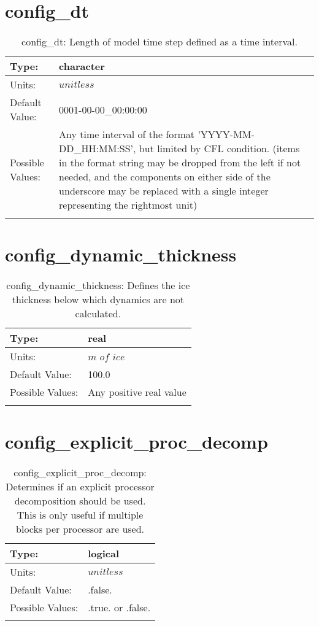 \section[config\_dt]{config\_dt}
\label{sec:nm_sec_config_dt}
\begin{center}
\begin{longtable}{| p{2.0in} || p{4.0in} |}
    \hline
    Type: & character \\
    \hline
    Units: & $unitless$ \\
    \hline
    Default Value: & 0001-00-00\_00:00:00 \\
    \hline
    Possible Values: & Any time interval of the format 'YYYY-MM-DD\_HH:MM:SS', but limited by CFL condition. (items in the format string may be dropped from the left if not needed, and the components on either side of the underscore may be replaced with a single integer representing the rightmost unit) \\
    \hline
    \caption{config\_dt: Length of model time step defined as a time interval.}
\end{longtable}
\end{center}
\section[config\_dynamic\_thickness]{config\_dynamic\_thickness}
\label{sec:nm_sec_config_dynamic_thickness}
\begin{center}
\begin{longtable}{| p{2.0in} || p{4.0in} |}
    \hline
    Type: & real \\
    \hline
    Units: & $m$ $of$ $ice$ \\
    \hline
    Default Value: & 100.0 \\
    \hline
    Possible Values: & Any positive real value \\
    \hline
    \caption{config\_dynamic\_thickness: Defines the ice thickness below which dynamics are not calculated.}
\end{longtable}
\end{center}
\section[config\_explicit\_proc\_decomp]{config\_explicit\_proc\_decomp}
\label{sec:nm_sec_config_explicit_proc_decomp}
\begin{center}
\begin{longtable}{| p{2.0in} || p{4.0in} |}
    \hline
    Type: & logical \\
    \hline
    Units: & $unitless$ \\
    \hline
    Default Value: & .false. \\
    \hline
    Possible Values: & .true. or .false. \\
    \hline
    \caption{config\_explicit\_proc\_decomp: Determines if an explicit processor decomposition should be used. This is only useful if multiple blocks per processor are used.}
\end{longtable}
\end{center}
